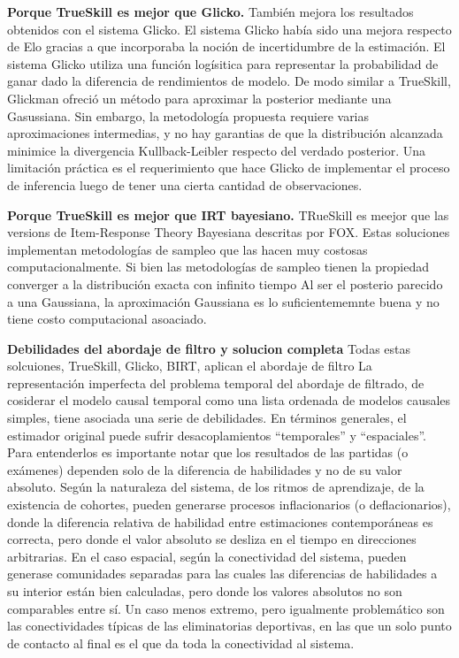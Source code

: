 \documentclass[article]{jss}
\begin{document}

\textbf{Porque TrueSkill es mejor que Glicko.}
%
También mejora los resultados obtenidos con el sistema Glicko.
%
El sistema Glicko había sido una mejora respecto de Elo gracias a que incorporaba la noción de incertidumbre de la estimación.
%
El sistema Glicko utiliza una función logísitica para representar la probabilidad de ganar dado la diferencia de rendimientos de modelo.
%
De modo similar a TrueSkill, Glickman ofreció un método para aproximar la posterior mediante una Gasussiana.
%
Sin embargo, la metodología propuesta requiere varias aproximaciones intermedias, y no hay garantias de que la distribución alcanzada minimice la divergencia Kullback-Leibler respecto del verdado posterior.
%
Una limitación práctica es el requerimiento que hace Glicko de implementar el proceso de inferencia luego de tener una cierta cantidad de observaciones.


\textbf{Porque TrueSkill es mejor que IRT bayesiano.}
%
TRueSkill es meejor que las versions de Item-Response Theory Bayesiana descritas por FOX.
%
Estas soluciones implementan metodologías de sampleo que las hacen muy costosas computacionalmente.
%
Si bien las metodologías de sampleo tienen la propiedad converger a la distribución exacta con infinito tiempo
%
Al ser el posterio parecido a una Gaussiana, la aproximación Gaussiana es lo suficientememnte buena y no tiene costo computacional asoaciado.


\textbf{Debilidades del abordaje de filtro y solucion completa}
%
Todas estas solcuiones, TrueSkill, Glicko, BIRT, aplican el abordaje de filtro
%
La representación imperfecta del problema temporal del abordaje de filtrado, de cosiderar el modelo causal temporal como una lista ordenada de modelos causales simples, tiene asociada una serie de debilidades.
%
En términos generales, el estimador original puede sufrir desacoplamientos ``temporales'' y ``espaciales''.
%
Para entenderlos es importante notar que los resultados de las partidas (o exámenes) dependen solo de la diferencia de habilidades y no de su valor absoluto.
%
Según la naturaleza del sistema, de los ritmos de aprendizaje, de la existencia de cohortes, pueden generarse procesos inflacionarios (o deflacionarios), donde la diferencia relativa de habilidad entre estimaciones contemporáneas es correcta, pero donde el valor absoluto se desliza en el tiempo en direcciones arbitrarias.
%
En el caso espacial, según la conectividad del sistema, pueden generase comunidades separadas para las cuales las diferencias de habilidades a su interior están bien calculadas, pero donde los valores absolutos no son comparables entre sí.
%
Un caso menos extremo, pero igualmente problemático son las conectividades típicas de las eliminatorias deportivas, en las que un solo punto de contacto al final es el que da toda la conectividad al sistema.
\end{document}
